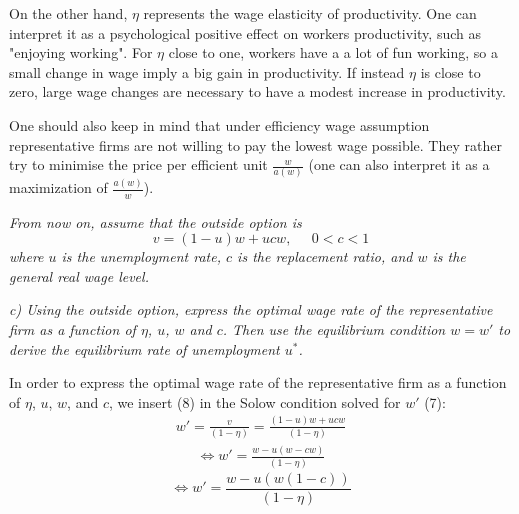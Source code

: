 \documentclass[11pt]{article} %
\begin{document}
On the other hand, $\eta$ represents the wage elasticity of productivity. One can interpret it as a psychological positive effect on workers productivity, such as "enjoying working". For $\eta$ close to one, workers have a a lot of fun working, so a small change in wage imply a big gain in productivity. If instead $\eta$ is close to zero, large wage changes are necessary to have a modest increase in productivity. \par

One should also keep in mind that under efficiency wage assumption representative firms are not willing to pay the lowest wage possible. They rather try to minimise the price per efficient unit $\frac{w} {a(w)}$ (one can also interpret it as a maximization of $\frac{a(w)} {w}$).\par

\textit{From now on, assume that the outside option is}
\begin{equation}
    v = (1-u)w+ucw, \;\;\;\;\; 0<c<1
\end{equation}
\textit{where $u$ is the unemployment rate, $c$ is the replacement ratio, and $w$ is the general real wage level.}



\pagebreak
\textit{c) Using the outside option, express the optimal wage rate of the representative firm as a function of $\eta$, $u$, $w$ and $c$. Then use the equilibrium
condition $w=w'$ to derive the equilibrium rate of unemployment $u^*$.} \par
\bigskip
In order to express  the  optimal  wage  rate  of  the  representative  firm  as
a  function  of $\eta$, $u$, $w$, and $c$, we insert (8) in the Solow condition solved for $w'$ (7):
\begin{align*}
    w' = \frac{v} {(1 - \eta)} = \frac{(1-u)w+ucw} {(1 - \eta)}
\end{align*}
\begin{align*}
   \Longleftrightarrow w' = \frac{w - u\left(w - cw\right)} {(1 - \eta)}
\end{align*}
\begin{equation}
   \Longleftrightarrow w' = \frac{w - u\left(w (1 - c)\right)} {(1 - \eta)}
\end{equation}
\end{document}
